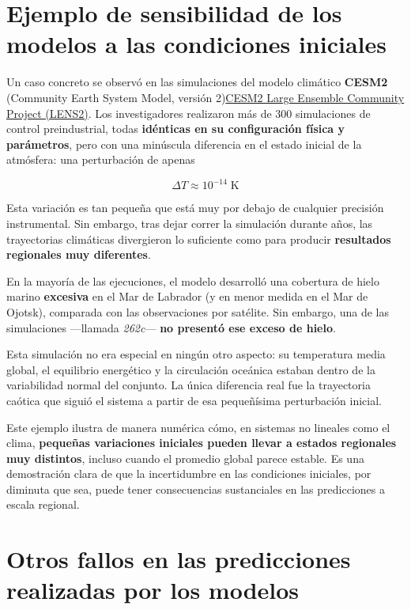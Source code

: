\documentclass[
  11pt,
  a4paper,
  DIV=11,
  numbers=noendperiod]{scrreprt}
\begin{document}
\section{Ejemplo de sensibilidad de los modelos a las condiciones
iniciales}\label{ejemplo-de-sensibilidad-de-los-modelos-a-las-condiciones-iniciales}

Un caso concreto se observó en las simulaciones del modelo climático
\textbf{CESM2} (Community Earth System Model, versión
2)\href{https://www.cesm.ucar.edu/community-projects/lens2}{CESM2 Large
Ensemble Community Project (LENS2)}. Los investigadores realizaron más
de 300 simulaciones de control preindustrial, todas \textbf{idénticas en
su configuración física y parámetros}, pero con una minúscula diferencia
en el estado inicial de la atmósfera: una perturbación de apenas

\[
\Delta T \approx 10^{-14} \; \text{K}
\]

Esta variación es tan pequeña que está muy por debajo de cualquier
precisión instrumental. Sin embargo, tras dejar correr la simulación
durante años, las trayectorias climáticas divergieron lo suficiente como
para producir \textbf{resultados regionales muy diferentes}.

En la mayoría de las ejecuciones, el modelo desarrolló una cobertura de
hielo marino \textbf{excesiva} en el Mar de Labrador (y en menor medida
en el Mar de Ojotsk), comparada con las observaciones por satélite. Sin
embargo, una de las simulaciones ---llamada \emph{262c}--- \textbf{no
presentó ese exceso de hielo}.

Esta simulación no era especial en ningún otro aspecto: su temperatura
media global, el equilibrio energético y la circulación oceánica estaban
dentro de la variabilidad normal del conjunto. La única diferencia real
fue la trayectoria caótica que siguió el sistema a partir de esa
pequeñísima perturbación inicial.

Este ejemplo ilustra de manera numérica cómo, en sistemas no lineales
como el clima, \textbf{pequeñas variaciones iniciales pueden llevar a
estados regionales muy distintos}, incluso cuando el promedio global
parece estable. Es una demostración clara de que la incertidumbre en las
condiciones iniciales, por diminuta que sea, puede tener consecuencias
sustanciales en las predicciones a escala regional.

\section{Otros fallos en las predicciones realizadas por los
modelos}\label{otros-fallos-en-las-predicciones-realizadas-por-los-modelos}
\end{document}
